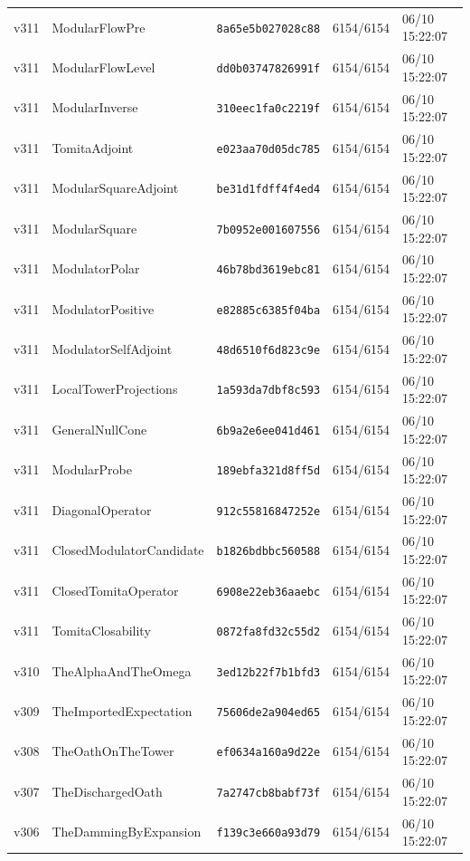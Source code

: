 \documentclass[11pt]{article}
\theoremstyle{definition}\newtheorem{deriv}{Derivação}
\begin{document}
{\begin{longtable}{@{}lllll@{}}
v311 & ModularFlowPre & \texttt{8a65e5b027028c88} & 6154/6154 & 06/10 15:22:07 \\
v311 & ModularFlowLevel & \texttt{dd0b03747826991f} & 6154/6154 & 06/10 15:22:07 \\
v311 & ModularInverse & \texttt{310eec1fa0c2219f} & 6154/6154 & 06/10 15:22:07 \\
v311 & TomitaAdjoint & \texttt{e023aa70d05dc785} & 6154/6154 & 06/10 15:22:07 \\
v311 & ModularSquareAdjoint & \texttt{be31d1fdff4f4ed4} & 6154/6154 & 06/10 15:22:07 \\
v311 & ModularSquare & \texttt{7b0952e001607556} & 6154/6154 & 06/10 15:22:07 \\
v311 & ModulatorPolar & \texttt{46b78bd3619ebc81} & 6154/6154 & 06/10 15:22:07 \\
v311 & ModulatorPositive & \texttt{e82885c6385f04ba} & 6154/6154 & 06/10 15:22:07 \\
v311 & ModulatorSelfAdjoint & \texttt{48d6510f6d823c9e} & 6154/6154 & 06/10 15:22:07 \\
v311 & LocalTowerProjections & \texttt{1a593da7dbf8c593} & 6154/6154 & 06/10 15:22:07 \\
v311 & GeneralNullCone & \texttt{6b9a2e6ee041d461} & 6154/6154 & 06/10 15:22:07 \\
v311 & ModularProbe & \texttt{189ebfa321d8ff5d} & 6154/6154 & 06/10 15:22:07 \\
v311 & DiagonalOperator & \texttt{912c55816847252e} & 6154/6154 & 06/10 15:22:07 \\
v311 & ClosedModulatorCandidate & \texttt{b1826bdbbc560588} & 6154/6154 & 06/10 15:22:07 \\
v311 & ClosedTomitaOperator & \texttt{6908e22eb36aaebc} & 6154/6154 & 06/10 15:22:07 \\
v311 & TomitaClosability & \texttt{0872fa8fd32c55d2} & 6154/6154 & 06/10 15:22:07 \\
v310 & TheAlphaAndTheOmega & \texttt{3ed12b22f7b1bfd3} & 6154/6154 & 06/10 15:22:07 \\
v309 & TheImportedExpectation & \texttt{75606de2a904ed65} & 6154/6154 & 06/10 15:22:07 \\
v308 & TheOathOnTheTower & \texttt{ef0634a160a9d22e} & 6154/6154 & 06/10 15:22:07 \\
v307 & TheDischargedOath & \texttt{7a2747cb8babf73f} & 6154/6154 & 06/10 15:22:07 \\
v306 & TheDammingByExpansion & \texttt{f139c3e660a93d79} & 6154/6154 & 06/10 15:22:07 \\

\end{longtable}}
\end{document}
